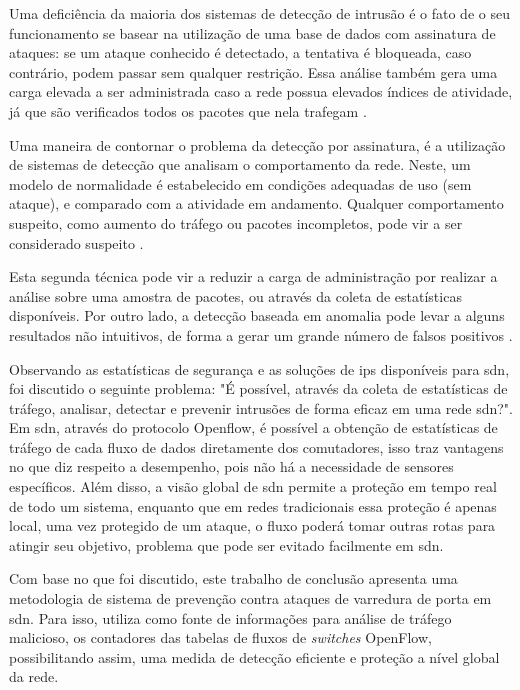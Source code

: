 Uma deficiência da maioria dos sistemas de detecção de intrusão é o fato de o seu funcionamento se basear na utilização de uma base de dados com assinatura de ataques: se um ataque conhecido é detectado, a tentativa é bloqueada, caso contrário, podem passar sem qualquer restrição. Essa análise também gera uma carga elevada a ser administrada caso a rede possua elevados índices de atividade, já que são verificados todos os pacotes que nela trafegam \cite{unifoa:2007}.

Uma maneira de contornar o problema da detecção por assinatura, é a utilização de sistemas de detecção que analisam o comportamento da rede. Neste, um modelo de normalidade é estabelecido em condições adequadas de uso (sem ataque), e comparado com a atividade em andamento. Qualquer comportamento suspeito, como aumento do tráfego ou pacotes incompletos, pode vir a ser considerado suspeito  \cite{unifoa:2007}.

Esta segunda técnica pode vir a reduzir a carga de administração por realizar a análise sobre uma amostra de pacotes, ou através da coleta de estatísticas disponíveis. Por outro lado, a detecção baseada em anomalia pode levar a alguns resultados não intuitivos, de forma a gerar um grande número de falsos positivos \cite{heberlein:2007}.

Observando as estatísticas de segurança e as soluções de \gls{ips} disponíveis para \gls{sdn}, foi discutido o seguinte problema: "É possível, através da coleta de estatísticas de tráfego, analisar, detectar e prevenir intrusões de forma eficaz em uma rede \gls{sdn}?". Em \gls{sdn}, através do protocolo Openflow, é possível a obtenção de estatísticas de tráfego de cada fluxo de dados diretamente dos comutadores, isso traz vantagens no que diz respeito a desempenho, pois não há a necessidade de sensores específicos. Além disso, a visão global de \gls{sdn} permite a proteção em tempo real de todo um sistema, enquanto que em redes tradicionais essa proteção é apenas local, uma vez protegido de um ataque, o fluxo poderá tomar outras rotas para atingir seu objetivo, problema que pode ser evitado facilmente em \gls{sdn}.

Com base no que foi discutido, este trabalho de conclusão apresenta uma metodologia de sistema de prevenção contra ataques de varredura de porta em \gls{sdn}. Para isso, utiliza como fonte de informações para análise de tráfego malicioso, os contadores das tabelas de fluxos de \textit{switches} OpenFlow, possibilitando assim, uma medida de detecção eficiente e proteção a nível global da rede.

